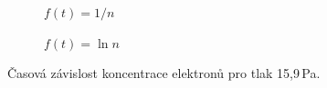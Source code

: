 \documentclass[a4paper,12pt]{article}
\begin{document}
\begin{figure}[h]
	\centering
	\begin{subfigure}[b]{.49\linewidth}
		\centering
		\caption{$f(t) = 1/n$}
	\end{subfigure}
	\begin{subfigure}[b]{.49\linewidth}
		\centering
		\caption{$f(t) = \ln n$}
	\end{subfigure}
	\caption{Časová závislost koncentrace elektronů pro tlak 15,9\,Pa.}
	\label{g:10Pa}
\end{figure}
\end{document}
